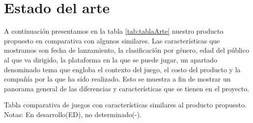 \chapter{Estado del arte}

A continuación presentamos en la tabla \ref{tab:tablaArte} nuestro producto propuesto en comparativa con algunos similares. Las características que mostramos son fecha de lanzamiento, la clasificación por género, edad del público al que va dirigido, la plataforma en la que se puede jugar, un apartado denominado tema que engloba el contexto del juego, el costo del producto y la compañía por la que ha sido realizado. Esto se muestra a fin de mostrar un panorama general de las diferencias y características que se tienen en el proyecto.
\begin{table}[htbp]
	\centering
	\caption{Tabla comparativa de juegos con características similares al producto propuesto. Notas: En desarrollo(ED), no determinado(-).}
	\label{tab:tablaArte}
	

\end{table}
